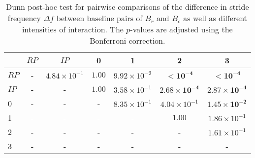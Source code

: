 \begin{table}
\centering
\caption{Dunn post-hoc test for pairwise comparisons of the difference in stride frequency $\Delta f$ between baseline pairs of $B_r$ and $B_c$ as well as different intensities of interaction. The $p$-values are adjusted using the Bonferroni correction.}
\label{tab:dunn_delta_f}
\begin{tabular}{lcccccc}
\toprule
 & $RP$ & $IP$ & 0 & 1 & 2 & 3 \\
\midrule
$RP$ & - & $4.84 \times 10^{-1}$ & $1.00$ & $9.92 \times 10^{-2}$ & $\mathbf{< 10^{-4}}$ & $\mathbf{< 10^{-4}}$ \\
$IP$ & - & - & $1.00$ & $3.58 \times 10^{-1}$ & $\mathbf{2.68 \times 10^{-4}}$ & $\mathbf{2.87 \times 10^{-4}}$ \\
0 & - & - & - & $8.35 \times 10^{-1}$ & $4.04 \times 10^{-1}$ & $\mathbf{1.45 \times 10^{-2}}$ \\
1 & - & - & - & - & $1.00$ & $1.86 \times 10^{-1}$ \\
2 & - & - & - & - & - & $1.61 \times 10^{-1}$ \\
3 & - & - & - & - & - & - \\
\bottomrule
\end{tabular}
\end{table}
